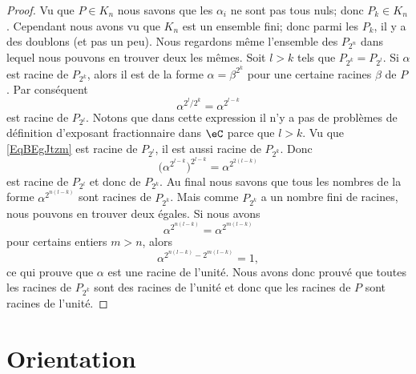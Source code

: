 \begin{proof}
	Vu que \( P\in K_n\) nous savons que les \( \alpha_i\) ne sont pas tous nuls; donc \( P_k\in K_n\). Cependant nous avons vu que \( K_n\) est un ensemble fini; donc parmi les \( P_k\), il y a des doublons (et pas un peu). Nous regardons même l'ensemble des \( P_{2^n}\) dans lequel nous pouvons en trouver deux les mêmes. Soit \( l>k\) tels que \( P_{2^k}=P_{2^l}\). Si \( \alpha\) est racine de \( P_{2^k}\), alors il est de la forme \( \alpha=\beta^{2^k}\) pour une certaine racines \( \beta\) de \( P\). Par conséquent
	\begin{equation}    \label{EqBEgJtzm}
		\alpha^{2^l/2^k}=\alpha^{2^{l-k}}
	\end{equation}
	est racine de \( P_{2^l}\). Notons que dans cette expression il n'y a pas de problèmes de définition d'exposant fractionnaire dans \( \eC\) parce que \( l>k\). Vu que \eqref{EqBEgJtzm} est racine de \( P_{2^l}\), il est aussi racine de \( P_{2^k}\). Donc
	\begin{equation}
		\big( \alpha^{2^{l-k}} \big)^{2^{l-k}}=\alpha^{2^{2(l-k)}}
	\end{equation}
	est racine de \( P_{2^l}\) et donc de \( P_{2^k}\). Au final nous savons que tous les nombres de la forme \( \alpha^{2^{n(l-k)}}\) sont racines de \( P_{2^k}\). Mais comme \( P_{2^k}\) a un nombre fini de racines, nous pouvons en trouver deux égales. Si nous avons
	\begin{equation}
		\alpha^{2^{n(l-k)}}=\alpha^{2^{m(l-k)}}
	\end{equation}
	pour certains entiers \( m>n\), alors
	\begin{equation}
		\alpha^{2^{n(l-k)}-2^{m(l-k)}}=1,
	\end{equation}
	ce qui prouve que \( \alpha\) est une racine de l'unité. Nous avons donc prouvé que toutes les racines de \( P_{2^k}\) sont des racines de l'unité et donc que les racines de \( P\) sont racines de l'unité.
\end{proof}

\section{Orientation}

